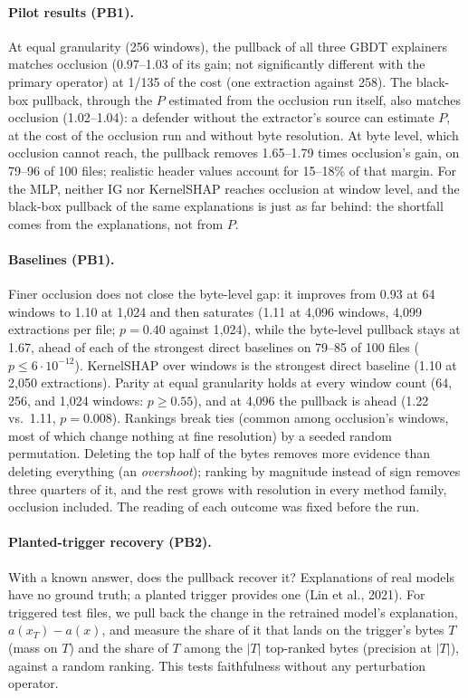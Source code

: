 \paragraph{Pilot results (PB1).} At equal granularity (256 windows), the pullback of all three GBDT explainers matches occlusion (0.97--1.03 of its gain; not significantly different with the primary operator) at 1/135 of the cost (one extraction against 258). The black-box pullback, through the $P$ estimated from the occlusion run itself, also matches occlusion (1.02--1.04): a defender without the extractor's source can estimate $P$, at the cost of the occlusion run and without byte resolution. At byte level, which occlusion cannot reach, the pullback removes 1.65--1.79 times occlusion's gain, on 79--96 of 100 files; realistic header values account for 15--18\% of that margin. For the MLP, neither IG nor KernelSHAP reaches occlusion at window level, and the black-box pullback of the same explanations is just as far behind: the shortfall comes from the explanations, not from $P$.

\paragraph{Baselines (PB1).} Finer occlusion does not close the byte-level gap: it improves from 0.93 at 64 windows to 1.10 at 1{,}024 and then saturates (1.11 at 4{,}096 windows, 4{,}099 extractions per file; $p = 0.40$ against 1{,}024), while the byte-level pullback stays at 1.67, ahead of each of the strongest direct baselines on 79--85 of 100 files ($p \leq 6 \cdot 10^{-12}$). KernelSHAP over windows is the strongest direct baseline (1.10 at 2{,}050 extractions). Parity at equal granularity holds at every window count (64, 256, and 1{,}024 windows: $p \geq 0.55$), and at 4{,}096 the pullback is ahead (1.22 vs.\ 1.11, $p = 0.008$). Rankings break ties (common among occlusion's windows, most of which change nothing at fine resolution) by a seeded random permutation. Deleting the top half of the bytes removes more evidence than deleting everything (an \textit{overshoot}); ranking by magnitude instead of sign removes three quarters of it, and the rest grows with resolution in every method family, occlusion included. The reading of each outcome was fixed before the run.

\paragraph{Planted-trigger recovery (PB2).} With a known answer, does the pullback recover it? Explanations of real models have no ground truth; a planted trigger provides one (Lin et al., 2021). %
For triggered test files, we pull back the change in the retrained model's explanation, $a(x_T) - a(x)$, and measure the share of it that lands on the trigger's bytes $T$ (mass on $T$) and the share of $T$ among the $|T|$ top-ranked bytes (precision at $|T|$), against a random ranking. This tests faithfulness without any perturbation operator.

